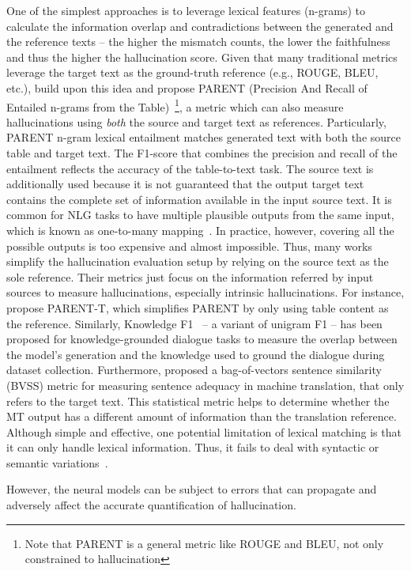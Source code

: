 \label{section:statistical_metric}
One of the simplest approaches is to leverage lexical features (n-grams) to calculate the information overlap and contradictions between the generated and the reference texts -- the higher the mismatch counts, the lower the faithfulness and thus the higher the hallucination score. 
Given that many traditional metrics leverage the target text as the ground-truth reference (e.g., ROUGE, BLEU, etc.),  build upon this idea and propose PARENT (Precision And Recall of Entailed n-grams from the Table)~\footnote{Note that PARENT is a general metric like ROUGE and BLEU, not only constrained to hallucination}, a metric which can also measure hallucinations using \textit{both} the source and target text as references.
Particularly, PARENT n-gram lexical entailment matches generated text with both the source table and target text. The F1-score that combines the precision and recall of the entailment reflects the accuracy of the table-to-text task.
The source text is additionally used because it is not guaranteed that the output target text contains the complete set of information available in the input source text.
It is common for NLG tasks to have multiple plausible outputs from the same input, which is known as one-to-many mapping~. 
In practice, however, covering all the possible outputs is too expensive and almost impossible. Thus, many works simplify the hallucination evaluation setup by relying on the source text as the sole reference. Their metrics just focus on the information referred by input sources to measure hallucinations, especially intrinsic hallucinations.
For instance,  propose PARENT-T, which simplifies PARENT by only using table content as the reference. 
Similarly, Knowledge F1~ -- a variant of unigram F1 -- has been proposed for knowledge-grounded dialogue tasks to measure the overlap between the model’s generation and the knowledge used to ground the dialogue during dataset collection. 
Furthermore,  proposed a bag-of-vectors sentence similarity (BVSS) metric for measuring sentence adequacy in machine translation, that only refers to the target text. This statistical metric helps to determine whether the MT output has a different amount of information than the translation reference. 
Although simple and effective, one potential limitation of lexical matching is that it can only handle lexical information. Thus, it fails to deal with syntactic or semantic variations~.

\label{subsec:model_based_metric}
 However, the neural models can be subject to errors that can propagate and adversely affect the accurate quantification of hallucination.


